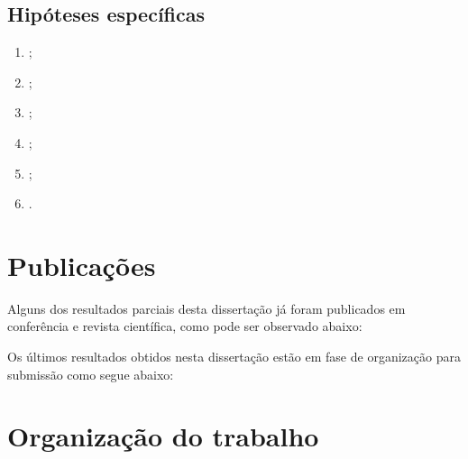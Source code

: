 \subsection{Hipóteses específicas}
\label{sec-hipoteses-especificas}
\begin{enumerate}
\item{\label{he1ref} \heatexto;}
\item{\label{he2ref} \hebtexto;}
\item{\label{he3ref} \hectexto;}
\item{\label{he4ref} \hedtexto;}
\item{\label{he5ref} \heetexto;}
\item{\label{he6ref} \heftexto.}
\end{enumerate}

\section{Publicações}
\label{sec-publicacoes}
Alguns dos resultados parciais desta dissertação já
foram publicados em conferência e revista científica,
como pode ser observado abaixo:
\begin{itemize}

\end{itemize}
Os últimos resultados obtidos nesta dissertação estão
em fase de organização para submissão como segue abaixo:

\section{Organização do trabalho}
